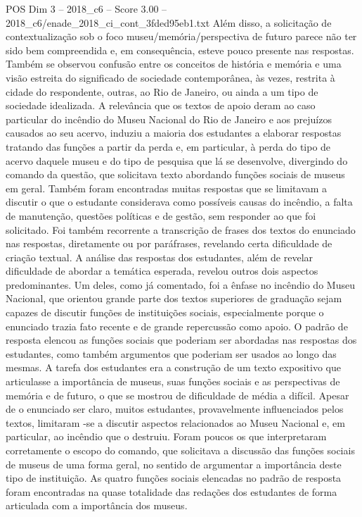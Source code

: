 \begin{textsample}{POS Dim 3 – 2018\_c6 – Score 3.00 – 2018\_c6/enade\_2018\_ci\_cont\_3fded95eb1.txt}
Além disso, a solicitação de contextualização sob o foco museu/memória/perspectiva de futuro parece não ter sido bem compreendida e, em consequência, esteve pouco presente nas respostas.
Também se observou confusão entre os conceitos de história e memória e uma visão estreita do significado de sociedade contemporânea, às vezes, restrita à cidade do respondente, outras, ao Rio de Janeiro, ou ainda a um tipo de sociedade idealizada.
A relevância que os textos de apoio deram ao caso particular do incêndio do Museu Nacional do Rio de Janeiro e aos prejuízos causados ao seu acervo, induziu a maioria dos estudantes a elaborar respostas tratando das funções a partir da perda e, em particular, à perda do tipo de acervo daquele museu e do tipo de pesquisa que lá se desenvolve, divergindo do comando da questão, que solicitava texto abordando funções sociais de museus em geral.
Também foram encontradas muitas respostas que se limitavam a discutir o que o estudante considerava como possíveis causas do incêndio, a falta de manutenção, questões políticas e de gestão, sem responder ao que foi solicitado.
Foi também recorrente a transcrição de frases dos textos do enunciado nas respostas, diretamente ou por paráfrases, revelando certa dificuldade de criação textual.
A análise das respostas dos estudantes, além de revelar dificuldade de abordar a temática esperada, revelou outros dois aspectos predominantes.
Um deles, como já comentado, foi a ênfase no incêndio do Museu Nacional, que orientou grande parte dos textos superiores de graduação sejam capazes de discutir funções de instituições sociais, especialmente porque o enunciado trazia fato recente e de grande repercussão como apoio.
O padrão de resposta elencou as funções sociais que poderiam ser abordadas nas respostas dos estudantes, como também argumentos que poderiam ser usados ao longo das mesmas.
A tarefa dos estudantes era a construção de um texto expositivo que articulasse a importância de museus, suas funções sociais e as perspectivas de memória e de futuro, o que se mostrou de dificuldade de média a difícil.
Apesar de o enunciado ser claro, muitos estudantes, provavelmente influenciados pelos textos, limitaram -se a discutir aspectos relacionados ao Museu Nacional e, em particular, ao incêndio que o destruiu.
Foram poucos os que interpretaram corretamente o escopo do comando, que solicitava a discussão das funções sociais de museus de uma forma geral, no sentido de argumentar a importância deste tipo de instituição.
As quatro funções sociais elencadas no padrão de resposta foram encontradas na quase totalidade das redações dos estudantes de forma articulada com a importância dos museus.

\end{textsample}

